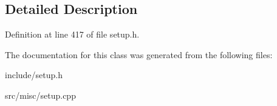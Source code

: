 \subsection{Detailed Description}


Definition at line 417 of file setup.\-h.



The documentation for this class was generated from the following files\-:\begin{DoxyCompactItemize}
\item 
include/setup.\-h\item 
src/misc/setup.\-cpp\end{DoxyCompactItemize}
